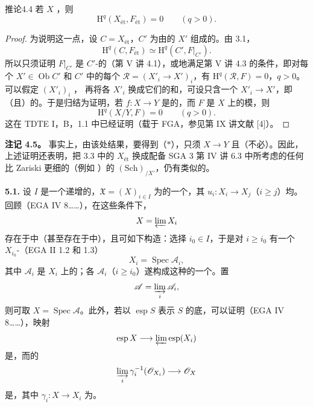 \begin{SGAresult}{推论}{4.4}
若 $X$ ，则
\[
 \mathrm H^q(X_{\text{ét}},F_{\text{ét}})=0\qquad(q>0).
\]
\end{SGAresult}
\begin{proof}
为说明这一点，设 $C=X_{\text{ét}}$，$C'$ 为由的 $X'$ 组成的。由 3.1，
\[
 \mathrm H^q(C,F_{\text{ét}})\simeq\mathrm H^q(C',F|_{C'}).
\]
所以只须证明 $F|_{C'}$ 是 $C'$-的（第 V 讲 4.1），或地满足第 V 讲 4.3 的条件，即对每个 $X'\in\operatorname{Ob}C'$ 和 $C'$ 中的每个 $\mathscr R=(X'_i\to X')_i$，有 $\mathrm H^q(\mathscr R,F)=0$，$q>0$。可以假定 $(X'_i)_i$ ，
再将各 $X'_i$ 换成它们的和，可设只含一个 $X'_i\to X'$，即（且）的。于是归结为证明，若 $f:X\to Y$ 是的，而 $F$ 是 $X$ 上的模，则
\[
 \mathrm H^q(X/Y,F)=0\qquad(q>0).\tag{*}
\]
这在 TDTE I，B，1.1 中已经证明（载于 FGA，参见第 IX 讲文献 [4]）。
\end{proof}

\textbf{注记 4.5。} 事实上，由该处结果，要得到（$*$），只须 $X\to Y$ 且（不必）。因此，上述证明还表明，把 3.3 中的 $X_{\text{ét}}$ 换成配备 SGA 3 第 IV 讲 6.3 中所考虑的任何比 Zariski 更细的（例如 ）的 $(\mathrm{Sch})_{/X'}$，仍有类似的。

\textbf{5.1.} 设 $I$ 是一个递增的，$\mathfrak X=(X)_{i\in I}$ 为的一个，其 $u_i:X_i\to X_j$（$i\geq j$）均。回顾（EGA IV 8……），在这些条件下，
\[
 X=\varprojlim X_i
\]
存在于中（甚至存在于中），且可如下构造：选择 $i_0\in I$，于是对 $i\geq i_0$ 有一个 $X_{i_0}$-（EGA II 1.2 和 1.3）
\[
 X_i=\operatorname{Spec}\mathscr A_i,
\]
其中 $\mathscr A_i$ 是 $X_i$ 上的；各 $\mathscr A_i$（$i\geq i_0$）遂构成这种的一个。置
\[
 \mathscr A=\varinjlim_i\mathscr A_i,
\]
则可取 $X=\operatorname{Spec}\mathscr A$。此外，若以 $\operatorname{esp}S$ 表示 $S$ 的底，可以证明（EGA IV 8……），映射
\[
 \operatorname{esp}X\longrightarrow\varprojlim\operatorname{esp}(X_i)
\]
是，而的
\[
 \varinjlim_i\gamma_i^{-1}(\mathscr O_{X_i})\longrightarrow\mathscr O_X
\]
是，其中 $\gamma_i:X\to X_i$ 为。

